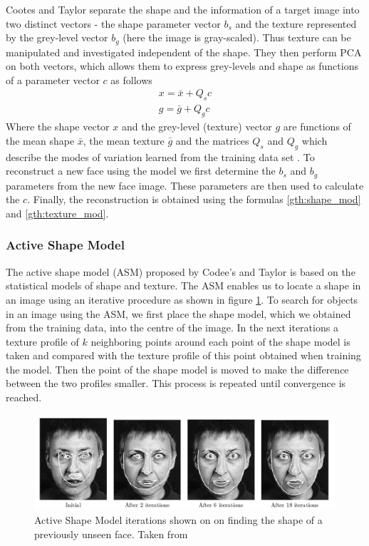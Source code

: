 \documentclass[11pt,a4paper]{report}
\begin{document}
Cootes and Taylor separate the shape and the information of a target image into
two distinct vectors - the shape parameter vector $b_s$ and the texture
represented by the grey-level vector $b_g$ (here the image is gray-scaled). Thus
texture can be manipulated and investigated independent of the shape. They
then perform PCA on both vectors, which allows them to express grey-levels and
shape as functions of a parameter vector $c$ as follows
\begin{gather} \label{gth:shape_mod} 
x = \bar{x} + Q_s c\\ \label{gth:texture_mod}
g = \bar{g} + Q_g c
\end{gather}
Where the shape vector $x$ and the grey-level (texture) vector $g$ are functions of the
mean shape $\bar{x}$, the mean texture $\bar{g}$ and the matrices $Q_s$ and
$Q_g$ which describe the modes of variation learned from the training data set
\cite{activeApp04}. To reconstruct a new face using the model we first determine the $b_s$ and
$b_g$ parameters from the new face image. These parameters are then
used to calculate the $c$. Finally, the reconstruction is obtained using the
formulas \ref{gth:shape_mod} and \ref{gth:texture_mod}.

\subsubsection{Active Shape Model}
The active shape model (ASM) proposed by Codee's and Taylor \cite{activeApp04} is based
on the statistical models of shape and texture. The ASM enables us to locate a
shape in an image using an iterative
procedure as shown in figure \ref{gr:asm}. To search for objects in an image
using the ASM, we first place the shape model, which we obtained from the training data, into
the centre of the image. In the next iterations a texture profile of $k$
neighboring points around each point of the shape model is taken and compared
with the texture profile of this point obtained when training the model. Then
the point of the shape model is moved to make the difference between the two
profiles smaller. This process is repeated until convergence is reached.

\begin{figure}[H]
\centering
\includegraphics[scale=0.5]{images/scary_face2.png}
\caption{ Active Shape Model iterations shown on on finding the shape of a
  previously unseen face. Taken from \cite{cootesOverview01} }
\label{gr:asm}
\end{figure}
\end{document}
